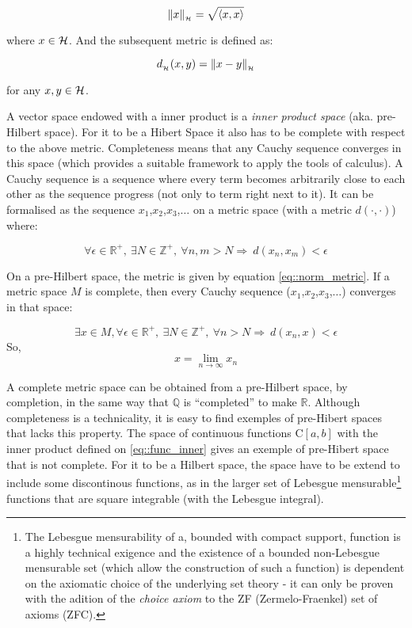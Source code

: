 \begin{equation}
  \| x \|_{_{\mathcal{H}}} = \sqrt{ \langle x,x \rangle }
\end{equation}

where $x \in \mathcal{H}$. And the subsequent metric is defined as:

\begin{equation}\label{eq::norm_metric}
  d_{_{\mathcal{H}}}(x,y) = \| x - y \|_{_{\mathcal{H}}}
\end{equation}

for any $x,y \in \mathcal{H}$.

A vector space endowed with a inner product is a \textit{inner product space}
(aka. pre-Hilbert space). For it to be a Hibert Space it also has to be complete
with respect to the above metric. Completeness means that any Cauchy sequence
converges in this space (which provides a suitable framework to apply the tools
of calculus). A Cauchy sequence is a sequence where every term becomes
arbitrarily close to each other as the sequence progress (not only to term
right next to it). It can be formalised as the sequence
$x_1$,$x_2$,$x_3$,$\ldots$ on a metric space (with a metric $d( \cdot ,\cdot)$)
where:


\[ \forall \epsilon \in \mathbb{R}^+, ~\exists N \in \mathbb{Z}^+, ~\forall
n,m>N \Longrightarrow ~d(x_n,x_m)<\epsilon
\]

On a pre-Hilbert space, the metric is given by equation \ref{eq::norm_metric}.
If a metric space $M$ is complete, then every Cauchy sequence
($x_1$,$x_2$,$x_3$,$\ldots$) converges in that space:

\[ \exists x \in M, \forall \epsilon \in \mathbb{R}^+, ~\exists N \in \mathbb{Z}^+, ~\forall
n>N \Longrightarrow ~d(x_n,x)<\epsilon
\]
So,
\[ x = \lim_{n\to\infty} x_n \]

A complete metric space can be obtained from a pre-Hilbert space, by completion,
in the same way that $\mathbb{Q}$ is ``completed'' to make $\mathbb{R}$.
Although completeness is a technicality, it is easy to find exemples of
pre-Hibert spaces that lacks this property. The space of continuous functions
C$[a,b]$ with the inner product defined on \ref{eq::func_inner} gives an exemple
of pre-Hibert space that is not complete. For it to be a Hilbert space, the
space have to be extend to include some discontinous functions, as in the larger
set of Lebesgue mensurable\footnote{The Lebesgue mensurability of a, bounded
with compact support, function is a highly technical exigence and the existence
of a bounded non-Lebesgue mensurable set (which allow the construction of such a
function) is dependent on the axiomatic choice of the underlying set theory - it
can only be proven with the adition of the \textit{choice axiom} to the
ZF (Zermelo-Fraenkel) set of axioms (ZFC). } functions that are square
integrable (with the Lebesgue integral).

